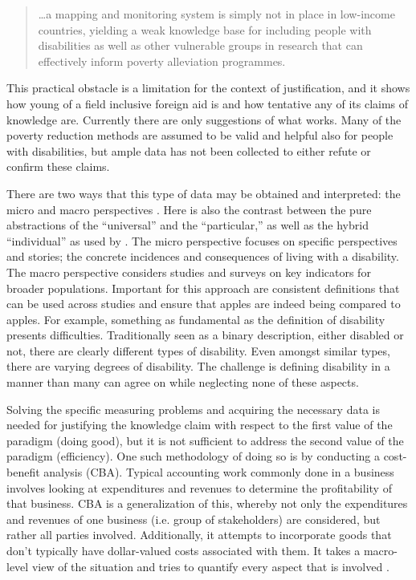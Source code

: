 \documentclass[a4paper]{article}
\begin{document}
\begin{quote}
\ldots a mapping and monitoring system is simply not in place in low-income
countries, yielding a weak knowledge base for including people with
disabilities as well as other vulnerable groups in research that can
effectively inform poverty alleviation programmes.
\end{quote}

This practical obstacle is a limitation for the context of justification, and
it shows how young of a field inclusive foreign aid is and how tentative any
of its claims of knowledge are. Currently there are only suggestions of what
works.  Many of the poverty reduction methods are assumed to be valid and
helpful also for people with disabilities, but ample data has not been
collected to either refute or confirm these claims.

There are two ways that this type of data may be obtained and interpreted: the
micro and macro perspectives \citep{ingstad2011disability}. Here is also the
contrast between the pure abstractions of the ``universal'' and the
``particular,'' as well as the hybrid ``individual'' as used by
\cite{collingwood1922history}. The micro perspective focuses on specific
perspectives and stories; the  concrete incidences and consequences of living
with a disability. The macro perspective considers studies and surveys on key
indicators for broader populations. Important for this approach are consistent
definitions that can be used across studies and ensure that apples are indeed
being compared to apples. For example, something as fundamental as the
definition of disability presents difficulties. Traditionally seen as a binary
description, either disabled or not, there are clearly different types of
disability. Even amongst similar types, there are varying degrees of
disability. The challenge is defining disability in a manner than many can
agree on while neglecting none of these aspects.

Solving the specific measuring problems and acquiring the necessary data is
needed for justifying the knowledge claim with respect to the first value of
the paradigm (doing good), but it is not sufficient to address the second value
of the paradigm (efficiency). One such methodology of doing so is by conducting
a cost-benefit analysis (CBA). Typical accounting work commonly done in a
business involves looking at expenditures and revenues to determine the
profitability of that business. CBA is a generalization of this, whereby not
only the expenditures and revenues of one business (i.e. group of stakeholders)
are considered, but rather all parties involved. Additionally, it attempts to
incorporate goods that don't typically have dollar-valued costs associated with
them. It takes a macro-level view of the situation and tries to quantify every
aspect that is involved \cite{mishan2015elements}.
\end{document}
